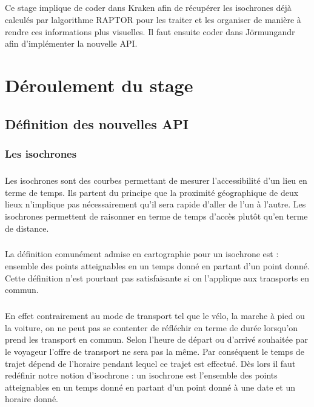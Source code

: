 \documentclass[a4paper]{report}
\begin{document}
\paragraph{} Ce stage implique de coder dans Kraken afin de récupérer les isochrones déjà calculés par lalgorithme RAPTOR pour les traiter et les organiser de manière à rendre ces informations plus visuelles. Il faut ensuite coder dans Jörmungandr afin d'implémenter la nouvelle API. 

\chapter{Déroulement du stage}

\section{Définition des nouvelles API}

\subsection{Les isochrones}

\paragraph{}Les isochrones sont des courbes permettant de mesurer l'accessibilité d'un lieu en terme de temps. Ils partent du principe que la proximité géographique de deux lieux n'implique pas nécessairement qu'il sera rapide d'aller de l'un à l'autre. Les isochrones permettent de raisonner en terme de temps d'accès plutôt qu'en terme de distance.

\paragraph{}La définition comunément admise en cartographie pour un isochrone est : ensemble des points atteignables en un temps donné en partant d'un point donné. Cette définition n'est pourtant pas satisfaisante si on l'applique aux transports en commun. 

\paragraph{}En effet contrairement au mode de transport tel que le vélo, la marche à pied ou la voiture, on ne peut pas se contenter de réfléchir en terme de durée lorsqu'on prend les transport en commun. Selon l'heure de départ ou d'arrivé souhaitée par le voyageur l'offre de transport ne sera pas la même. Par conséquent le temps de trajet dépend de l'horaire pendant lequel ce trajet est effectué. Dès lors il faut redéfinir notre notion d'isochrone : un isochrone est l'ensemble des points atteignables en un temps donné en partant d'un point donné à une date et un horaire donné.
\end{document}
